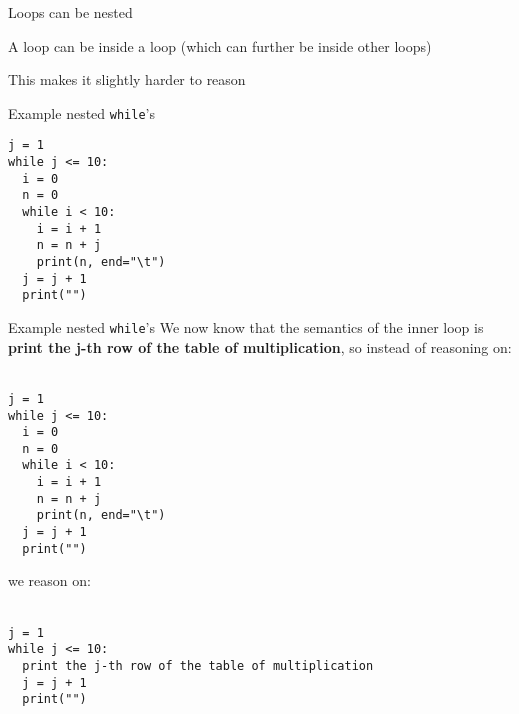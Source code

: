 \documentclass{beamer}
\begin{document}
\begin{slide}{
\item Loops can be nested
\item A loop can be inside a loop (which can further be inside other loops)
\item This makes it slightly harder to reason
}\end{slide}

\begin{frame}[fragile]{Example nested \texttt{while}'s}
\begin{lstlisting}[frame=shadowbox,basicstyle=\ttfamily\tiny]
j = 1
while j <= 10:
  i = 0
  n = 0
  while i < 10:
    i = i + 1
    n = n + j
    print(n, end="\t")
  j = j + 1
  print("")
\end{lstlisting}
\end{frame}

\begin{frame}[fragile]{Example nested \texttt{while}'s}
We now know that the semantics of the inner loop is \textbf{print the j-th row of the table of multiplication}, so instead of reasoning on: \\ \ \\

\begin{lstlisting}[frame=shadowbox,basicstyle=\ttfamily\tiny]
j = 1
while j <= 10:
  i = 0
  n = 0
  while i < 10:
    i = i + 1
    n = n + j
    print(n, end="\t")
  j = j + 1
  print("")
\end{lstlisting}

we reason on: \\ \ \\

\begin{lstlisting}[frame=shadowbox,basicstyle=\ttfamily\tiny]
j = 1
while j <= 10:
  print the j-th row of the table of multiplication
  j = j + 1
  print("")
\end{lstlisting}

\end{frame}
\end{document}
